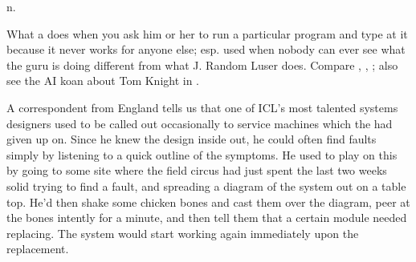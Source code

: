  n.

What a  does when you ask him or her to run a particular program
and type at it because it never works for anyone else; esp. used when nobody can
ever see what the guru is doing different from what J. Random Luser does.
Compare , , ; also see the AI koan about Tom Knight in .

A correspondent from England tells us that one of ICL's most talented systems
designers used to be called out occasionally to service machines which the
 had given up on. Since he knew the design inside out,
he could often find faults simply by listening to a quick outline of the
symptoms. He used to play on this by going to some site where the field circus
had just spent the last two weeks solid trying to find a fault, and spreading a
diagram of the system out on a table top. He'd then shake some chicken bones and
cast them over the diagram, peer at the bones intently for a minute, and then
tell them that a certain module needed replacing. The system would start working
again immediately upon the replacement.

